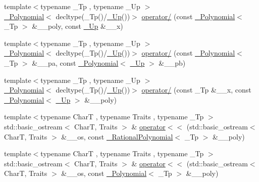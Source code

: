 \begin{DoxyCompactItemize}
\item 
{\footnotesize template$<$typename \+\_\+\+Tp , typename \+\_\+\+Up $>$ }\\\hyperlink{class____gnu__cxx_1_1__Polynomial}{\+\_\+\+Polynomial}$<$ decltype(\+\_\+\+Tp()/\hyperlink{namespace____gnu__cxx_ab693ea357b6429b331e0bf09f9442385}{\+\_\+\+Up}())$>$ \hyperlink{namespace____gnu__cxx_a5fd356349013bd60a41010cbf502444b}{operator/} (const \hyperlink{class____gnu__cxx_1_1__Polynomial}{\+\_\+\+Polynomial}$<$ \+\_\+\+Tp $>$ \&\+\_\+\+\_\+poly, const \hyperlink{namespace____gnu__cxx_ab693ea357b6429b331e0bf09f9442385}{\+\_\+\+Up} \&\+\_\+\+\_\+x)
\item 
{\footnotesize template$<$typename \+\_\+\+Tp , typename \+\_\+\+Up $>$ }\\\hyperlink{class____gnu__cxx_1_1__Polynomial}{\+\_\+\+Polynomial}$<$ decltype(\+\_\+\+Tp()/\hyperlink{namespace____gnu__cxx_ab693ea357b6429b331e0bf09f9442385}{\+\_\+\+Up}())$>$ \hyperlink{namespace____gnu__cxx_a6ba146c479b383e9ba26760c847e3dc6}{operator/} (const \hyperlink{class____gnu__cxx_1_1__Polynomial}{\+\_\+\+Polynomial}$<$ \+\_\+\+Tp $>$ \&\+\_\+\+\_\+pa, const \hyperlink{class____gnu__cxx_1_1__Polynomial}{\+\_\+\+Polynomial}$<$ \hyperlink{namespace____gnu__cxx_ab693ea357b6429b331e0bf09f9442385}{\+\_\+\+Up} $>$ \&\+\_\+\+\_\+pb)
\item 
{\footnotesize template$<$typename \+\_\+\+Tp , typename \+\_\+\+Up $>$ }\\\hyperlink{class____gnu__cxx_1_1__Polynomial}{\+\_\+\+Polynomial}$<$ decltype(\+\_\+\+Tp()/\hyperlink{namespace____gnu__cxx_ab693ea357b6429b331e0bf09f9442385}{\+\_\+\+Up}())$>$ \hyperlink{namespace____gnu__cxx_a4c1b4c46ffc6c41fb5b5d1a4293ca563}{operator/} (const \+\_\+\+Tp \&\+\_\+\+\_\+x, const \hyperlink{class____gnu__cxx_1_1__Polynomial}{\+\_\+\+Polynomial}$<$ \hyperlink{namespace____gnu__cxx_ab693ea357b6429b331e0bf09f9442385}{\+\_\+\+Up} $>$ \&\+\_\+\+\_\+poly)
\item 
{\footnotesize template$<$typename CharT , typename Traits , typename \+\_\+\+Tp $>$ }\\std\+::basic\+\_\+ostream$<$ CharT, Traits $>$ \& \hyperlink{namespace____gnu__cxx_a424044092ac184bfa1d17beb1b12e071}{operator$<$$<$} (std\+::basic\+\_\+ostream$<$ CharT, Traits $>$ \&\+\_\+\+\_\+os, const \hyperlink{class____gnu__cxx_1_1__RationalPolynomial}{\+\_\+\+Rational\+Polynomial}$<$ \+\_\+\+Tp $>$ \&\+\_\+\+\_\+poly)
\item 
{\footnotesize template$<$typename CharT , typename Traits , typename \+\_\+\+Tp $>$ }\\std\+::basic\+\_\+ostream$<$ CharT, Traits $>$ \& \hyperlink{namespace____gnu__cxx_ad713743dbfc30fba653621d1f7e99d3c}{operator$<$$<$} (std\+::basic\+\_\+ostream$<$ CharT, Traits $>$ \&\+\_\+\+\_\+os, const \hyperlink{class____gnu__cxx_1_1__Polynomial}{\+\_\+\+Polynomial}$<$ \+\_\+\+Tp $>$ \&\+\_\+\+\_\+poly)

\end{DoxyCompactItemize}
